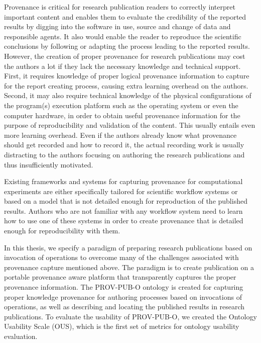  

Provenance is critical for research publication readers to correctly interpret important content and enables them to evaluate the credibility of the reported results by digging into the software in use, source and change of data and responsible agents. It also would enable the reader to reproduce the scientific conclusions by following or adapting the process leading to the reported results. However, the creation of proper provenance for research publications may cost the authors a lot if they lack the necessary knowledge and technical support. First, it requires knowledge of proper logical provenance information to capture for the report creating process, causing extra learning overhead on the authors. Second, it may also require technical knowledge of the physical configurations of the program(s) execution platform such as the operating system or even the computer hardware, in order to obtain useful provenance information for the purpose of reproducibility and validation of the content. This usually entails even more learning overhead. Even if the authors already know what provenance should get recorded and how to record it, the actual recording work is usually distracting to the authors focusing on authoring the research publications and thus insufficiently motivated.

Existing frameworks and systems for capturing provenance for computational experiments are either specifically tailored for scientific workflow systems or based on a model that is not detailed enough for reproduction of the published results. Authors who are not familiar with any workflow system need to learn how to use one of these systems in order to create provenance that is detailed enough for reproducibility with them.

In this thesis, we specify a paradigm of preparing research publications based on invocation of operations to overcome many of the challenges associated with provenance capture mentioned above. The paradigm is to create publication on a portable provenance aware platform that transparently captures the proper provenance information. The PROV-PUB-O ontology is created for capturing proper knowledge provenance for authoring processes based on invocations of operations, as well as describing and locating the published results in research publications. To evaluate the usability of PROV-PUB-O, we created the Ontology Usability Scale (OUS), which is the first set of metrics for ontology usability evaluation.

